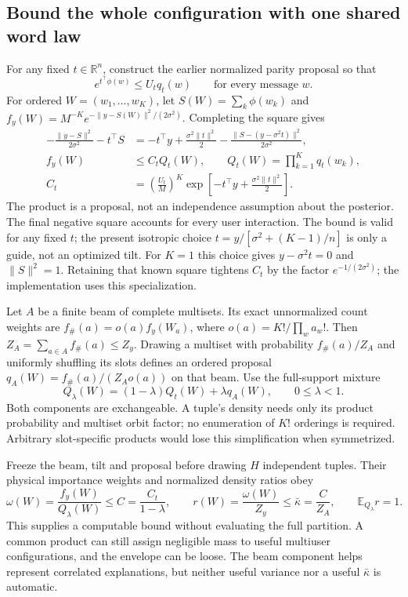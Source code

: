 \documentclass[10pt,a4paper]{article}
\newcommand{\E}{\mathbb E}
\begin{document}
\subsection{Bound the whole configuration with one shared word law}
For any fixed $t\in\mathbb R^n$, construct the earlier normalized parity proposal so that
\[
 e^{t^\top\phi(w)}\leq U_tq_t(w)\qquad\text{for every message }w.
\]
For ordered $W=(w_1,\ldots,w_K)$, let $S(W)=\sum_k\phi(w_k)$ and
$f_y(W)=M^{-K}e^{-\|y-S(W)\|^2/(2\sigma^2)}$. Completing the square gives
\begin{align}
 -\frac{\|y-S\|^2}{2\sigma^2}-t^\top S
 &=-t^\top y+\frac{\sigma^2\|t\|^2}{2}
   -\frac{\|S-(y-\sigma^2t)\|^2}{2\sigma^2},\nonumber\\
 f_y(W)&\leq C_tQ_t(W),\qquad Q_t(W)=\prod_{k=1}^Kq_t(w_k),\label{eq:tuple-envelope}\\
 C_t&=\left(\frac{U_t}{M}\right)^K
       \exp\left[-t^\top y+\frac{\sigma^2\|t\|^2}{2}\right].\nonumber
\end{align}
The product is a proposal, not an independence assumption about the posterior. The final negative
square accounts for every user interaction. The bound is valid for any fixed $t$; the present
isotropic choice $t=y/[\sigma^2+(K-1)/n]$ is only a guide, not an optimized tilt.
For $K=1$ this choice gives $y-\sigma^2t=0$ and $\|S\|^2=1$. Retaining that known square
tightens $C_t$ by the factor $e^{-1/(2\sigma^2)}$; the implementation uses this specialization.

Let $A$ be a finite beam of complete multisets. Its exact unnormalized count weights are
$f_\#(a)=o(a)f_y(W_a)$, where $o(a)=K!/\prod_w a_w!$.
Then $Z_A=\sum_{a\in A}f_\#(a)\leq Z_y$. Drawing a multiset with probability $f_\#(a)/Z_A$ and
uniformly shuffling its slots defines an ordered proposal $q_A(W)=f_\#(a)/(Z_Ao(a))$ on that beam.
Use the full-support mixture
\begin{equation}
 Q_\lambda(W)=(1-\lambda)Q_t(W)+\lambda q_A(W),\qquad 0\leq\lambda<1.
 \label{eq:exchangeable-mixture}
\end{equation}
Both components are exchangeable. A tuple's density needs only its product probability and multiset
orbit factor; no enumeration of $K!$ orderings is required. Arbitrary slot-specific products would
lose this simplification when symmetrized.

Freeze the beam, tilt and proposal before drawing $H$ independent tuples. Their physical importance
weights and normalized density ratios obey
\begin{equation}
 \omega(W)=\frac{f_y(W)}{Q_\lambda(W)}
 \leq C=\frac{C_t}{1-\lambda},\qquad
 r(W)=\frac{\omega(W)}{Z_y}\leq \bar\kappa=\frac{C}{Z_A},\qquad
 \E_{Q_\lambda}r=1.
 \label{eq:global-ratio}
\end{equation}
This supplies a computable bound without evaluating the full partition. A common product can still
assign negligible mass to useful multiuser configurations, and the envelope can be loose. The beam
component helps represent correlated explanations, but neither useful variance nor a useful
$\bar\kappa$ is automatic.
\end{document}

